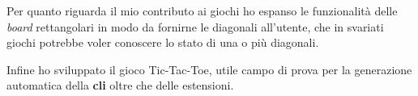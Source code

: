 Per quanto riguarda il mio contributo ai giochi ho espanso le funzionalità delle \textit{board} rettangolari in modo da fornirne le diagonali all'utente, che in svariati giochi potrebbe voler conoscere lo stato di una o più diagonali.

Infine ho sviluppato il gioco Tic-Tac-Toe, utile campo di prova per la generazione automatica della \textbf{cli} oltre che delle estensioni.